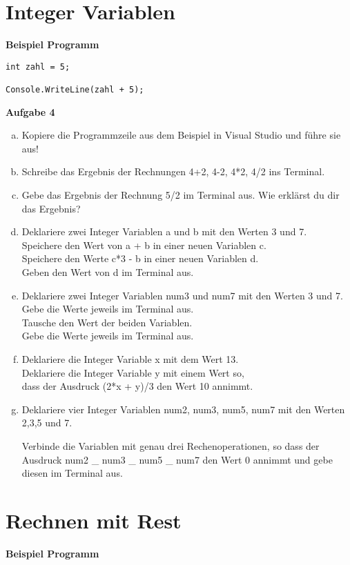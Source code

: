 \documentclass[a4paper,12pt]{article}
\newcommand{\Aufgabe}[1]{
  {
  \vspace*{0.5cm}
  \textsf{\textbf{Aufgabe #1}}
  \vspace*{0.2cm}
  
  }
}
\newcommand{\Definition}[1]{
  {
  \vspace*{0.5cm}
  \textsf{\textbf{#1}}
  \vspace*{0.2cm}
  
  }
}
\begin{document}
\section{Integer Variablen}
\Definition{Beispiel Programm}

\begin{verbatim}
int zahl = 5;

Console.WriteLine(zahl + 5);
\end{verbatim}

\Aufgabe{4} 
\begin{enumerate}[a)]
\item
Kopiere die Programmzeile aus dem Beispiel in Visual Studio und führe sie aus!
\item 
Schreibe das Ergebnis der Rechnungen 4+2, 4-2, 4*2, 4/2 ins Terminal.
\item
Gebe das Ergebnis der Rechnung 5/2 im Terminal aus. Wie erklärst du dir das Ergebnis?
\item 
Deklariere zwei Integer Variablen a und b mit den Werten 3 und 7.  \\
Speichere den Wert von a + b in einer neuen Variablen c. \\
Speichere den Werte c*3 - b in einer neuen Variablen d. \\
Geben den Wert von d im Terminal aus. \\
\item
Deklariere zwei Integer Variablen num3 und num7 mit den Werten 3 und 7.  \\
Gebe die Werte jeweils im Terminal aus. \\
Tausche den Wert der beiden Variablen. \\
Gebe die Werte jeweils im Terminal aus. \\
\item
Deklariere die Integer Variable x mit dem Wert 13.
\\
Deklariere die Integer Variable y mit einem Wert so, \\
 dass der Ausdruck (2*x + y)/3 den Wert 10 annimmt.
\item
Deklariere vier Integer Variablen num2, num3, num5, num7 mit den Werten 2,3,5 und 7.

Verbinde die Variablen mit genau drei Rechenoperationen, so dass der Ausdruck num2 \_ num3 \_ num5 \_ num7 den Wert 0 annimmt und gebe diesen im Terminal aus.
\end{enumerate}

\section{Rechnen mit Rest}
\Definition{Beispiel Programm}
\end{document}
